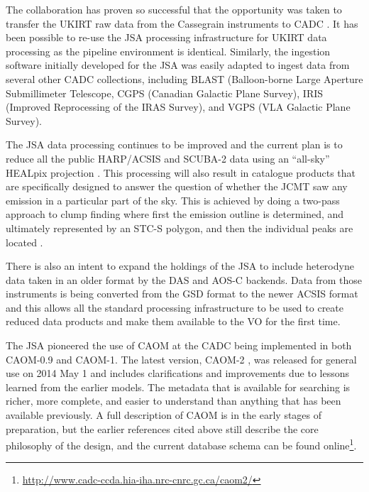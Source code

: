 \documentclass[final,authoryear,5p,times,twocolumn]{elsarticle}
\begin{document}
The collaboration has proven so successful that the opportunity was
taken to transfer the UKIRT raw data from the Cassegrain instruments
to CADC \citep{adassxxiii_P01}. It has been possible to re-use
the JSA processing infrastructure for UKIRT data processing as the
pipeline environment is identical.  Similarly, the ingestion
software initially developed for the JSA was easily adapted to ingest
data from several other CADC collections, including BLAST
(Balloon-borne Large Aperture Submillimeter Telescope, CGPS
(Canadian Galactic Plane Survey), IRIS (Improved Reprocessing
of the IRAS Survey), and VGPS (VLA Galactic Plane Survey).

The JSA data processing continues to be improved
\citep{2014JCMTN35..19J} and the current plan is to reduce all the
public HARP/ACSIS and SCUBA-2 data using an ``all-sky'' HEALpix
projection \citep{2005ApJ...622..759G,2014SPIE9152-93,2014JCMTN35..20B}. This processing
will also result in catalogue products that are specifically designed
to answer the question of whether the JCMT saw any emission in a
particular part of the sky. This is achieved by doing a two-pass
approach to clump
finding where first the emission outline is determined, and ultimately
represented by an STC-S polygon, and then the individual peaks are located
\citep{2014JCMTN35..21G}.

There is also an intent to expand the holdings of the JSA to include
heterodyne data taken in an older format by the DAS
\citep{1986SPIE..598..134B} and AOS-C backends. Data from those
instruments is being converted from the GSD format \citep{GSD1999} to the newer ACSIS format and this
allows all the standard processing infrastructure to be used to create
reduced data products and make them available to the VO for the first
time.

The JSA pioneered the use of CAOM at the CADC being implemented in both
CAOM-0.9 and CAOM-1.  The latest version, CAOM-2
\citep{2013ASPC..475..159R,2012ASPC..461..339D},  was released for general
use on 2014 May 1 and includes clarifications and improvements due to
lessons learned from the earlier models.
The metadata that is available for searching is richer, more complete, and easier
to understand than anything that has been available previously.
A full description of CAOM is in the early stages of preparation, but the earlier
references cited above still describe the core philosophy of the design, and the
current database schema can be found online\footnote{\url{http://www.cadc-ccda.hia-iha.nrc-cnrc.gc.ca/caom2/}}.
\end{document}
